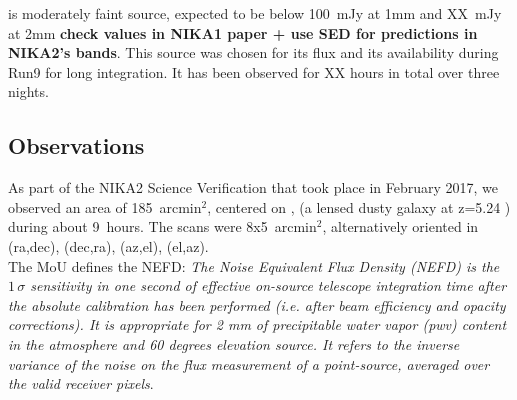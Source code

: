 


\hls is moderately faint source, expected to be below 100~mJy at 1mm and
XX~mJy at 2mm {\bf check values in NIKA1 paper + use SED for predictions in
  NIKA2's bands}. This source was chosen for its flux and its availability during
Run9 for long integration. It has been observed for XX hours in total over three
nights.


\subsection{Observations}

As part of the NIKA2 Science Verification that took place in February 2017, we
observed an area of 185~arcmin$^2$, centered on \hls, (a lensed dusty galaxy at
z=5.24 \cite{combes2012}) during about 9~hours. The scans were 8x5~arcmin$^2$,
alternatively oriented in (ra,dec), (dec,ra), (az,el), (el,az).\\

The MoU defines the NEFD:  \emph{The Noise Equivalent Flux Density (NEFD)
  is the $1\,\sigma$ sensitivity in one second of effective on-source telescope
  integration time after the absolute calibration has been performed (i.e. after
  beam efficiency and opacity corrections). It is appropriate for 2 mm of
  precipitable water vapor (pwv) content in the atmosphere and 60 degrees
  elevation source. It refers to the inverse variance of the noise on the flux
  measurement of a point-source, averaged over the valid receiver pixels}.

